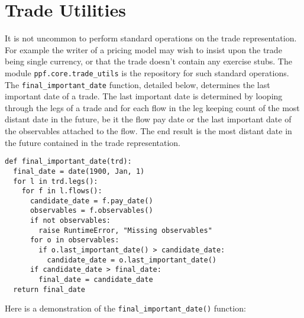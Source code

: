 \section{Trade Utilities}
It is not uncommon to perform standard operations on the trade
representation. For example the writer of a pricing model may wish to
insist upon the trade being single currency, or that the trade doesn't
contain any exercise stubs. The module \verb|ppf.core.trade_utils| is
the repository for such standard operations. The
\verb|final_important_date| function, detailed below, determines the
last important date of a trade. The last important date is determined
by looping through the legs of a trade and for each flow in the leg
keeping count of the most distant date in the future, be it the flow
pay date or the last important date of the observables attached to the
flow. The end result is the most distant date in the future contained
in the trade representation.
\begin{verbatim}
def final_important_date(trd):
  final_date = date(1900, Jan, 1)
  for l in trd.legs():
    for f in l.flows():
      candidate_date = f.pay_date()
      observables = f.observables()
      if not observables:
        raise RuntimeError, "Missing observables"
      for o in observables:
        if o.last_important_date() > candidate_date:
          candidate_date = o.last_important_date()
      if candidate_date > final_date:
        final_date = candidate_date
  return final_date
\end{verbatim}
Here is a demonstration of the \verb|final_important_date()| function:
